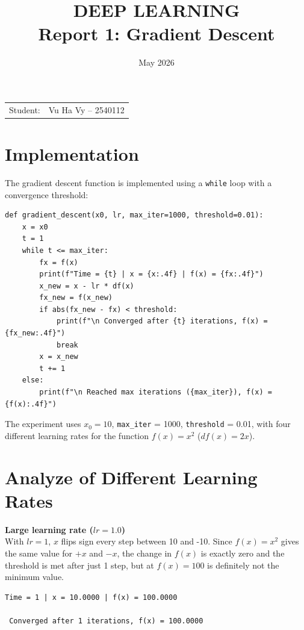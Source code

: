 \documentclass{article}
\title{\textbf{DEEP LEARNING} \\
{\Large \textbf{Report 1: Gradient Descent}}}
\date{May 2026}
\begin{document}
\pagestyle{plain}
\maketitle

\noindent\begin{tabular}{@{}ll}
  Student: & Vu Ha Vy -- 2540112 \\
\end{tabular}

\section*{Implementation}

The gradient descent function is implemented using a \texttt{while} loop with a convergence threshold:

\begin{verbatim}
def gradient_descent(x0, lr, max_iter=1000, threshold=0.01):
    x = x0
    t = 1
    while t <= max_iter:
        fx = f(x)
        print(f"Time = {t} | x = {x:.4f} | f(x) = {fx:.4f}")
        x_new = x - lr * df(x)
        fx_new = f(x_new)
        if abs(fx_new - fx) < threshold:
            print(f"\n Converged after {t} iterations, f(x) = {fx_new:.4f}")
            break
        x = x_new
        t += 1
    else:
        print(f"\n Reached max iterations ({max_iter}), f(x) = {f(x):.4f}")
\end{verbatim}

The experiment uses $x_0 = 10$, \texttt{max\_iter} = 1000, \texttt{threshold} = 0.01, with four different learning rates
for the function $f(x) = x^2$ ($df(x) = 2x$).

\section*{Analyze of Different Learning Rates}

\textbf{Large learning rate ($lr = 1.0$)}\\
With $lr = 1$, $x$ flips sign every step between 10 and -10. Since $f(x) = x^2$ gives the same value for $+x$ and $-x$, the change in $f(x)$ is exactly zero and the threshold is met after just 1 step, but at $f(x) = 100$ is definitely not the minimum value.
 
\begin{verbatim}
Time = 1 | x = 10.0000 | f(x) = 100.0000

 Converged after 1 iterations, f(x) = 100.0000
\end{verbatim}
\vspace{0.5em}
\end{document}
